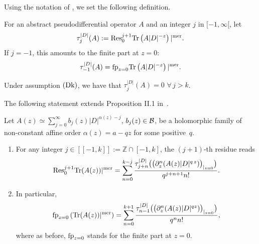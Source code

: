 \documentclass[pdftex]{sigma}
\def \Z {\mathbb Z}
\numberwithin{equation}{section}
\begin{document}
Using the notation of \cite{CoMo}, we set the following def\/inition.
\begin{definition}
 For an abstract pseudodif\/ferential operator $  A$ and an integer  $j$ in $ [-1, \infty[$, let
 \begin{gather}\label{eq:taukD}
\tau^{\vert D\vert}_j(A):={\rm Res}^{j+1}_{0} {\rm
    Tr} \left( A  \vert D\vert^{-z}\right)\vert^{\rm mer}.
\end{gather}
If $j=-1$, this amounts to the f\/inite part at $z=0$:
\[
\tau^{\vert D\vert}_{-1}(A)= {\rm fp}_{z=0} {\rm
    Tr} \left( A  \vert D\vert^{-z}\right)\vert^{\rm mer}.
    \]
\end{definition}
\begin{remark}  Under assumption ${\rm (Dk)}$, we have that
$\tau^{\vert D\vert}_j(A)=0$ $ \forall\, j> k$.
\end{remark}

 The
following statement extends Proposition II.1 in~\cite{CoMo}.

\begin{theorem} \label{thm:ResAz} Let $A(z)\simeq \sum\limits_{j=0}^\infty
b_j(z) \vert D\vert^{\alpha(z)-j}$, $b_j(z)\in {\cal B}$, be a holomorphic
family of non-constant affine order
  $\alpha(z)=a-q  z$ for some positive~$q$.
\begin{enumerate}
\itemsep=0pt
\item For any integer $j\in [[-1, k]]:= \Z\cap [-1, k]$, the  $(j+1)$-th residue reads
 \begin{gather*}%
{\rm Res}^{j+1}_{0} {\rm Tr}(A(z))\vert^{\rm mer}= \sum_{n=0}^{k-j}
\frac{\tau_{j+n}^{\vert D\vert}\big(\big(\partial_z^n (A(z)
  \vert D\vert^{q\, z})\big)_{\vert_{z=0}}\big)}{q^{j+n+1}  n!}.
\end{gather*}
\item In particular,
\[
{\rm fp}_{z=0}\left( {\rm Tr}(A(z))\vert^{\rm mer}\right)=
\sum_{n=0}^{k+1}
\frac{\tau_{n-1}^{\vert D\vert}\big(\big(\partial_z^n (A(z)
  \vert D\vert^{q z})\big)_{\vert_{z=0}}\big)}{q^{n}  n!},
\] where as before, ${\rm fp}_{z=0}$ stands for the finite part at $z=0$.
\end{enumerate}
\end{theorem}
\end{document}
